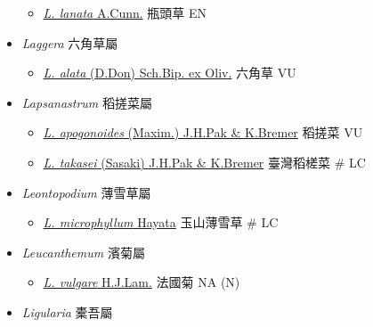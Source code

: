 \begin{itemize}
  \begin{itemize}
        \item[] \href{http://www.theplantlist.org/tpl1.1/search?q=Lagenophora+lanata}{\textit{L. lanata} A.Cunn.}   瓶頭草   EN
  \end{itemize}
 \item[] \textit{Laggera} 六角草屬
                                
  \begin{itemize}
        \item[] \href{http://www.theplantlist.org/tpl1.1/search?q=Laggera+alata}{\textit{L. alata} (D.Don) Sch.Bip. ex Oliv.}   六角草   VU
  \end{itemize}
 \item[] \textit{Lapsanastrum} 稻搓菜屬
                                
  \begin{itemize}
        \item[] \href{http://www.theplantlist.org/tpl1.1/search?q=Lapsanastrum+apogonoides}{\textit{L. apogonoides} (Maxim.) J.H.Pak \& K.Bremer}   稻搓菜   VU
        \item[] \href{http://www.theplantlist.org/tpl1.1/search?q=Lapsanastrum+takasei}{\textit{L. takasei} (Sasaki) J.H.Pak \& K.Bremer}   臺灣稻槎菜  \# LC
  \end{itemize}
 \item[] \textit{Leontopodium} 薄雪草屬
                                
  \begin{itemize}
        \item[] \href{http://www.theplantlist.org/tpl1.1/search?q=Leontopodium+microphyllum}{\textit{L. microphyllum} Hayata}   玉山薄雪草  \# LC
  \end{itemize}
 \item[] \textit{Leucanthemum} 濱菊屬
                                
  \begin{itemize}
        \item[] \href{http://www.theplantlist.org/tpl1.1/search?q=Leucanthemum+vulgare}{\textit{L. vulgare} H.J.Lam.}   法國菊   NA (N)
  \end{itemize}
 \item[] \textit{Ligularia} 橐吾屬
                                

\end{itemize}
